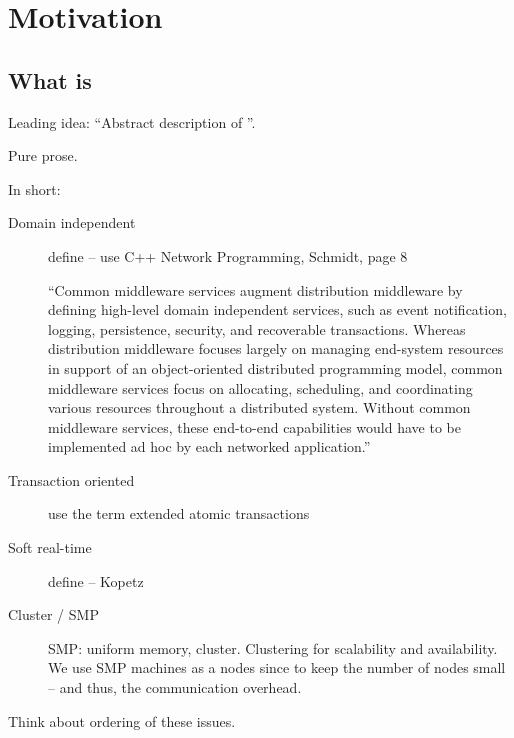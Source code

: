 %

\chapter{Motivation}


\section{What is \SYNEIGHT}
Leading idea: ``Abstract description of \SYNEIGHT''.

Pure prose.

In short:
\begin{description}
\item[Domain independent] define -- use C++ Network Programming,
Schmidt, page 8

``Common middleware services augment distribution middleware by defining
high-level domain independent services, such as event notification,
logging, persistence, security, and recoverable transactions. Whereas
distribution middleware focuses largely on managing end-system resources
in support of an object-oriented distributed programming model, common
middleware services focus on allocating, scheduling, and coordinating
various resources throughout a distributed system. Without common
middleware services, these end-to-end capabilities would have to be
implemented ad hoc by each networked application.''

\item[Transaction oriented] use the term extended atomic transactions
\item[Soft real-time] define -- Kopetz
\item[Cluster / SMP] SMP: uniform memory, cluster. Clustering for
scalability and availability. We use SMP machines as a nodes since to
keep the number of nodes small -- and thus, the communication
overhead.
\end{description}

Think about ordering of these issues. 

